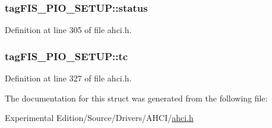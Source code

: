 \subsubsection[{\texorpdfstring{status}{status}}]{ tag\+F\+I\+S\+\_\+\+P\+I\+O\+\_\+\+S\+E\+T\+U\+P\+::status}\hypertarget{structtagFIS__PIO__SETUP_a849b51a7cd5e39d2486824189b6327b8}{}\label{structtagFIS__PIO__SETUP_a849b51a7cd5e39d2486824189b6327b8}


Definition at line 305 of file ahci.\+h.

\subsubsection[{\texorpdfstring{tc}{tc}}]{ tag\+F\+I\+S\+\_\+\+P\+I\+O\+\_\+\+S\+E\+T\+U\+P\+::tc}\hypertarget{structtagFIS__PIO__SETUP_af51569c7c38a1ba320ccb3e4481dcdc6}{}\label{structtagFIS__PIO__SETUP_af51569c7c38a1ba320ccb3e4481dcdc6}


Definition at line 327 of file ahci.\+h.



The documentation for this struct was generated from the following file\+:\begin{DoxyCompactItemize}
\item 
Experimental Edition/\+Source/\+Drivers/\+A\+H\+C\+I/\hyperlink{ahci_8h}{ahci.\+h}\end{DoxyCompactItemize}

